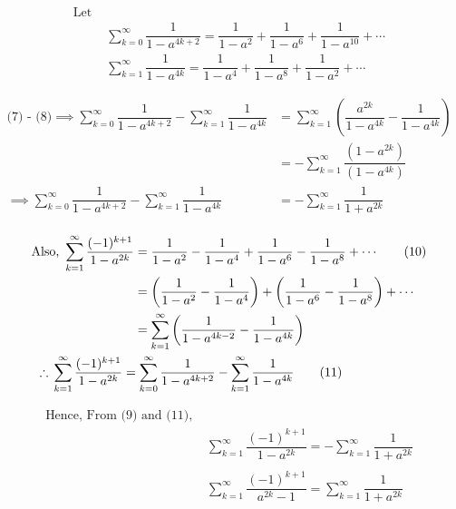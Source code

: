 \documentclass[12pt, a4paper]{article}
\begin{document}
\begin{align}
    \text{Let } \nonumber &\\
    & \sum_{k=0}^{\infty} \dfrac{1}{1-a^{4k+2}} = \dfrac{1}{1-a^2} + \dfrac{1}{1-a^6} + \dfrac{1}{1-a^{10}} + \cdots \\
    & \sum_{k=1}^{\infty} \dfrac{1}{1-a^{4k}} = \dfrac{1}{1-a^4} + \dfrac{1}{1-a^8} + \dfrac{1}{1-a^2} + \cdots
\end{align}

\begin{align*}
    \text{(7) - (8)} \implies \sum_{k=0}^{\infty} \dfrac{1}{1-a^{4k+2}} - \sum_{k=1}^{\infty} \dfrac{1}{1-a^{4k}} 
    & = \sum_{k=1}^{\infty} \left( \dfrac{a^{2k}}{1-a^{4k}} - \dfrac{1}{1-a^{4k}} \right) \\
    & = - \sum_{k=1}^{\infty} \dfrac{(1-a^{2k})}{(1-a^{4k})} \\
    \implies \sum_{k=0}^{\infty} \dfrac{1}{1-a^{4k+2}} - \sum_{k=1}^{\infty} \dfrac{1}{1-a^{4k}} 
    & = - \sum_{k=1}^{\infty} \dfrac{1}{1+a^{2k}} \tag{9}\\
\end{align*}

\begin{align*}
    \text{Also, } 
    \sum_{k=1}^{\infty} \dfrac{(-1)^{k+1}}{1-a^{2k}} &= \dfrac{1}{1-a^2} - \dfrac{1}{1-a^4} + \dfrac{1}{1-a^6} - \dfrac{1}{1-a^8} + \cdots \tag{10} \\
    & = \left( \dfrac{1}{1-a^2} - \dfrac{1}{1-a^4} \right) + \left( \dfrac{1}{1-a^6} - \dfrac{1}{1-a^8} \right) + \cdots \\
    & = \sum_{k=1}^{\infty} \left( \dfrac{1}{1-a^{4k-2}} - \dfrac{1}{1-a^{4k}} \right) \\
    &\hspace{-77px}\therefore \, \sum_{k=1}^{\infty} \dfrac{(-1)^{k+1}}{1-a^{2k}} = \sum_{k=0}^{\infty}\dfrac{1}{1-a^{4k+2}} - \sum_{k=1}^{\infty}\dfrac{1}{1-a^{4k}} \tag{11} \\
\end{align*}

\begin{align*}
    \text{Hence, From (9) and (11), } & \\
    & \sum_{k=1}^{\infty} \dfrac{(-1)^{k+1}}{1-a^{2k}} = - \sum_{k=1}^{\infty} \dfrac{1}{1+a^{2k}} \\ \\
    & \boxed{\sum_{k=1}^{\infty} \dfrac{(-1)^{k+1}}{a^{2k}-1} = \sum_{k=1}^{\infty} \dfrac{1}{1+a^{2k}}}
\end{align*}
\end{document}
